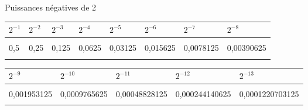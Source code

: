 \documentclass[11pt,a4paper]{article}
\begin{document}

\clearpage


\fancyhf{} %
\renewcommand{\headrulewidth}{0pt}
\renewcommand{\footrulewidth}{0pt}


\begin{center}
\begin{LARGE}
Puissances négatives de 2
\end{LARGE}
\end{center}


\vspace*{1cm}

\begin{center}

\begin{tabular}{ | C{0.5cm} | C{0.75cm} | C{1cm} | C{1.5cm} | C{1.75cm} | C{2cm} | C{2.25cm} | C{2.5cm} |}
\hline
$ 2^{-1} $ & $ 2^{-2} $ & $ 2^{-3} $ & $ 2^{-4} $ & $ 2^{-5} $ & $ 2^{-6} $ & $ 2^{-7} $ & $ 2^{-8} $ \\
\hline
     &      &       &        &         &          &           &            \\
 0,5 & 0,25 & 0,125 & 0,0625 & 0,03125 & 0,015625 & 0,0078125 & 0,00390625 \\
     &      &       &        &         &          &           &            \\
\hline
\end{tabular}

\vspace*{1cm}

\begin{tabular}{ | C{2.5cm} | C{2.75cm} | C{3cm} | C{3.25cm} | C{3.5cm} |}
\hline
$ 2^{-9} $ & $ 2^{-10} $ & $ 2^{-11} $ & $ 2^{-12} $ & $ 2^{-13} $ \\
\hline
             &              &               &                &                 \\
 0,001953125 & 0,0009765625 & 0,00048828125 & 0,000244140625 & 0,0001220703125 \\
             &              &               &                &                 \\
\hline
\end{tabular}

\end{center}

\vfillFirst

\vfillLast
\end{document}
